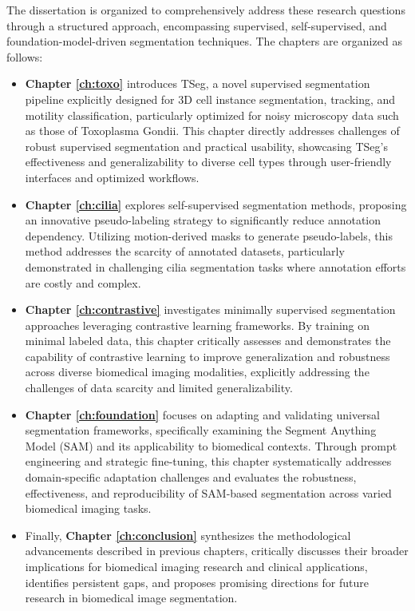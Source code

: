 \documentclass[./dissertation.tex]{subfiles}
\begin{document}

The dissertation is organized to comprehensively address these research questions through a structured approach, encompassing supervised, self-supervised, and foundation-model-driven segmentation techniques. The chapters are organized as follows:

\begin{itemize}

    \item \textbf{Chapter \ref{ch:toxo}} introduces TSeg, a novel supervised segmentation pipeline explicitly designed for 3D cell instance segmentation, tracking, and motility classification, particularly optimized for noisy microscopy data such as those of Toxoplasma Gondii. This chapter directly addresses challenges of robust supervised segmentation and practical usability, showcasing TSeg's effectiveness and generalizability to diverse cell types through user-friendly interfaces and optimized workflows.

    \item \textbf{Chapter \ref{ch:cilia}} explores self-supervised segmentation methods, proposing an innovative pseudo-labeling strategy to significantly reduce annotation dependency. Utilizing motion-derived masks to generate pseudo-labels, this method addresses the scarcity of annotated datasets, particularly demonstrated in challenging cilia segmentation tasks where annotation efforts are costly and complex.

    \item \textbf{Chapter \ref{ch:contrastive}} investigates minimally supervised segmentation approaches leveraging contrastive learning frameworks. By training on minimal labeled data, this chapter critically assesses and demonstrates the capability of contrastive learning to improve generalization and robustness across diverse biomedical imaging modalities, explicitly addressing the challenges of data scarcity and limited generalizability.

    \item \textbf{Chapter \ref{ch:foundation}} focuses on adapting and validating universal segmentation frameworks, specifically examining the Segment Anything Model (SAM) and its applicability to biomedical contexts. Through prompt engineering and strategic fine-tuning, this chapter systematically addresses domain-specific adaptation challenges and evaluates the robustness, effectiveness, and reproducibility of SAM-based segmentation across varied biomedical imaging tasks.

    \item Finally, \textbf{Chapter \ref{ch:conclusion}} synthesizes the methodological advancements described in previous chapters, critically discusses their broader implications for biomedical imaging research and clinical applications, identifies persistent gaps, and proposes promising directions for future research in biomedical image segmentation.

\end{itemize}
\end{document}
